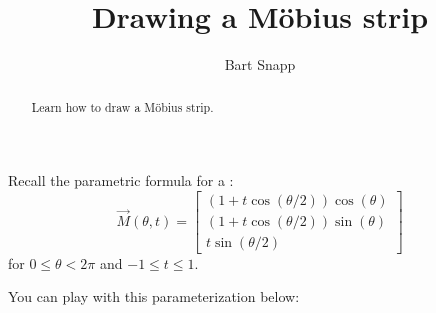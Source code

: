 \documentclass{ximera}
\author{Bart Snapp}
\title[Dig-In:]{Drawing a M\"obius strip}
\begin{document}
\begin{abstract}
  Learn how to draw a M\"obius strip.
\end{abstract}
\maketitle

Recall the parametric formula for a  :
\[
\vec{M}(\theta,t) =
\begin{bmatrix}
  (1 + t \cos(\theta/2))\cos(\theta)\\
  (1 + t \cos(\theta/2))\sin(\theta)\\
  t \sin(\theta/2)
\end{bmatrix}
\]
for $0\le \theta< 2\pi$ and $-1\le t\le 1$.
\begin{onlineOnly}
  You can play with this parameterization below:
  \begin{center}
  \end{center}
\end{onlineOnly}
\end{document}
